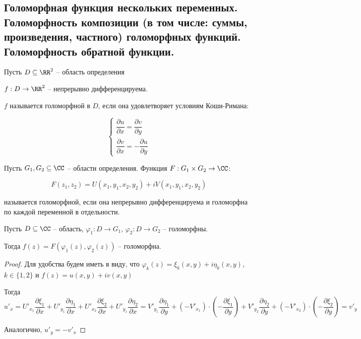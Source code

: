 \subsection{Голоморфная функция нескольких переменных. Голоморфность композиции (в том числе: суммы, произведения, частного) голоморфных функций. Голоморфность обратной функции.}

\begin{definition*}
    Пусть $D \subseteq \RR^2$ -- область определения

    $f: D \to \RR^2$ -- непрерывно дифференцируема.

    $f$ называется голоморфной в $D$, если она удовлетворяет условиям Коши-Римана:
    
    \begin{equation}
        \begin{cases}
            \dfrac{\partial u}{\partial x} = \dfrac{\partial v}{\partial y} \\
            \dfrac{\partial v}{\partial x} = -\dfrac{\partial u}{\partial y}
        \end{cases}
    \end{equation}

\end{definition*}

\begin{definition*}
    Пусть $G_1, G_2 \subseteq \CC$ -- области определения. Функция $F: G_1 \times G_2 \to \CC$:

    \begin{equation}
            F(z_1, z_2) = U(x_1, y_1, x_2, y_2) + i V(x_1, y_1, x_2, y_2)
    \end{equation}
    
    называется голоморфной, если она непрерывно дифференцируема и голоморфна по каждой переменной в отдельности.
\end{definition*}

\begin{theorem*}
    Пусть $D \subseteq \CC$ -- область, $\varphi_1: D \to G_1$, $\varphi_2: D \to G_2$ -- голоморфны. 

    Тогда $f(z) = F\left( \varphi_1(z), \varphi_2(z) \right)$ -- голоморфна.
\end{theorem*}

\begin{proof}
    Для удобства будем иметь в виду, что $\varphi_k(z) = \xi_k(x, y) + i \eta_k(x, y)$, $k \in \{1, 2\}$ и $f(z) = u(x, y) + iv(x, y)$
    
    Тогда
    \[
        u'_x = U'_{x_1}\dfrac{\partial \xi_1}{\partial x} + U'_{y_1}\dfrac{\partial \eta_1}{\partial x} + U'_{x_2}\dfrac{\partial \xi_2}{\partial x} + U'_{y_1}\dfrac{\partial \eta_2}{\partial x} = V'_{y_1}\dfrac{\partial \eta_1}{\partial y} + \left(-V'_{x_1}\right) \cdot \left( - \dfrac{\partial \xi_1}{\partial y} \right) + V'_{y_2} \dfrac{\partial \eta_2}{\partial y} + \left( -V'_{x_2} \right) \cdot \left( - \dfrac{\partial \xi_2}{\partial y} \right) = v'_y
    \]
        
    Аналогично, $u'_y = -v'_x$
\end{proof}

